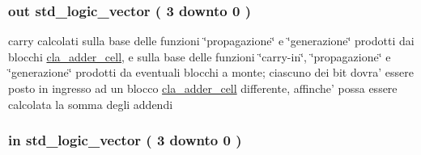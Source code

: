 \hypertarget{group___carry_network_ga6b265f3fe41195485dfedd9824c3598f}{
\subsubsection[{carryout}]{ {\bfseries \textcolor{vhdlchar}{out}\textcolor{vhdlchar}{ }} {\bfseries \textcolor{vhdlchar}{std\+\_\+logic\+\_\+vector}\textcolor{vhdlchar}{ }\textcolor{vhdlchar}{(}\textcolor{vhdlchar}{ }\textcolor{vhdlchar}{ } \textcolor{vhdldigit}{3} \textcolor{vhdlchar}{ }\textcolor{vhdlchar}{downto}\textcolor{vhdlchar}{ }\textcolor{vhdlchar}{ } \textcolor{vhdldigit}{0} \textcolor{vhdlchar}{ }\textcolor{vhdlchar}{)}\textcolor{vhdlchar}{ }} \hspace{0.3cm}{\ttfamily [Port]}}}\label{group___carry_network_ga6b265f3fe41195485dfedd9824c3598f}


carry calcolati sulla base delle funzioni \char`\"{}propagazione\char`\"{} e \char`\"{}generazione\char`\"{} prodotti dai blocchi \hyperlink{classcla__adder__cell}{cla\+\_\+adder\+\_\+cell}, e sulla base delle funzioni \char`\"{}carry-\/in\char`\"{}, \char`\"{}propagazione\char`\"{} e \char`\"{}generazione\char`\"{} prodotti da eventuali blocchi a monte; ciascuno dei bit dovra' essere posto in ingresso ad un blocco \hyperlink{classcla__adder__cell}{cla\+\_\+adder\+\_\+cell} differente, affinche' possa essere calcolata la somma degli addendi 

\hypertarget{group___carry_network_ga1ff97daaf4e03defc21748593cacfaa7}{
\subsubsection[{gen}]{ {\bfseries \textcolor{vhdlchar}{in}\textcolor{vhdlchar}{ }} {\bfseries \textcolor{vhdlchar}{std\+\_\+logic\+\_\+vector}\textcolor{vhdlchar}{ }\textcolor{vhdlchar}{(}\textcolor{vhdlchar}{ }\textcolor{vhdlchar}{ } \textcolor{vhdldigit}{3} \textcolor{vhdlchar}{ }\textcolor{vhdlchar}{downto}\textcolor{vhdlchar}{ }\textcolor{vhdlchar}{ } \textcolor{vhdldigit}{0} \textcolor{vhdlchar}{ }\textcolor{vhdlchar}{)}\textcolor{vhdlchar}{ }} \hspace{0.3cm}{\ttfamily [Port]}}}\label{group___carry_network_ga1ff97daaf4e03defc21748593cacfaa7}


